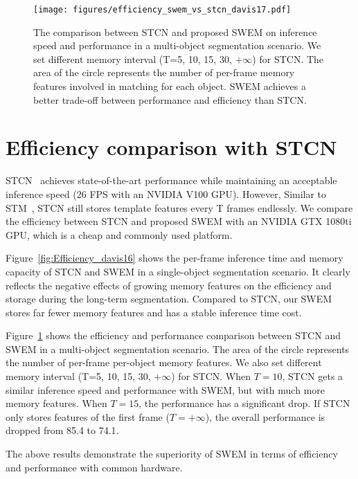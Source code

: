 \begin{figure}[b]
\begin{center}
\texttt{[image: figures/efficiency\_swem\_vs\_stcn\_davis17.pdf]}
\end{center}
   \caption{The comparison between STCN and proposed SWEM on inference speed and performance in a multi-object segmentation scenario. We set different memory interval (T=5, 10, 15, 30, $+\infty$) for STCN. The area of the circle represents the number of per-frame memory features involved in matching for each object. SWEM achieves a better trade-off between performance and efficiency than STCN.}
\label{fig:Efficiency_davis17}
\end{figure}

\section{Efficiency comparison with STCN}
\label{sec:eff}
STCN~\cite{cheng2021stcn} achieves state-of-the-art performance while maintaining an acceptable inference speed (26 FPS with an NVIDIA V100 GPU). However, Similar to STM~\cite{Oh_2019_ICCV}, STCN still stores template features every T frames endlessly.
We compare the efficiency between STCN and proposed SWEM with an NVIDIA GTX 1080ti GPU, which is a cheap and commonly used platform. 

Figure~\ref{fig:Efficiency_davis16} shows the per-frame inference time and memory capacity of STCN and SWEM in a single-object segmentation scenario. It clearly reflects the negative effects of growing memory features on the efficiency and storage during the long-term segmentation. Compared to STCN, our SWEM stores far fewer memory features and has a stable inference time cost.

Figure~\ref{fig:Efficiency_davis17} shows the efficiency and performance comparison between STCN and SWEM in a multi-object segmentation scenario. The area of the circle represents the number of per-frame per-object memory features. We also set different memory interval (T=5, 10, 15, 30, $+\infty$) for STCN. When $T=10$, STCN gets a similar inference speed and performance with SWEM, but with much more memory features. When $T=15$, the performance has a significant drop. If STCN only stores features of the first frame ($T=+\infty$), the overall performance is dropped from 85.4 to 74.1. 

The above results demonstrate the superiority of SWEM in terms of efficiency and performance with common hardware.

